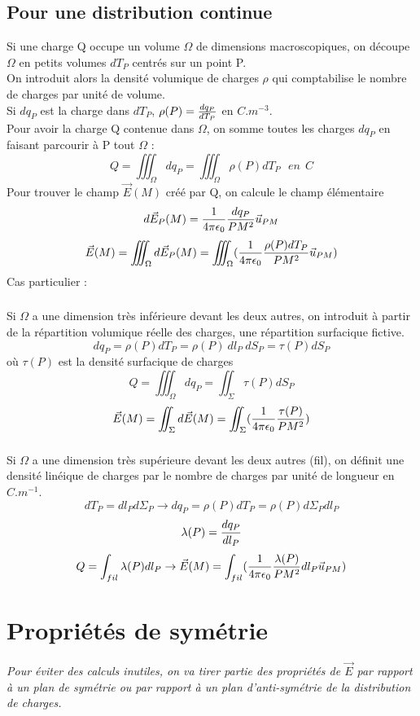 \documentclass[11pt,a4paper,french]{article}
\begin{document}
\subsection{Pour une distribution continue}
Si une charge Q occupe un volume $\Omega$ de dimensions macroscopiques, on découpe $\Omega$ en petits volumes $dT_P$ centrés sur un point P. \\
On introduit alors la densité volumique de charges $\rho$ qui comptabilise le nombre de charges par unité de volume. \\
Si $dq_P$ est la charge dans $dT_P$, $\rho(P) = {dq_P \over dT_P}$ en $C.m^{-3}$. \\
Pour avoir la charge Q contenue dans $\Omega$, on somme toutes les charges $dq_P$ en faisant parcourir à P tout $\Omega$ : 
$$Q = \iiint_\Omega dq_P =\iiint_\Omega \rho(P) dT_P ~~~ en~~ C$$
Pour trouver le champ $\vec E(M)$ créé par Q, on calcule le champ élémentaire
$$d \vec E_P(M) = {1 \over 4 \pi \epsilon_0}{dq_P \over PM^2}\vec u_{PM}$$
$$\vec E(M) = \iiint_\Omega d\vec E_P(M) = \iiint_\Omega ({1 \over 4\pi\epsilon_0}{\rho(P)dT_P \over PM^2}\vec u_{PM})$$
\newpage
Cas particulier : \\
\subsubsection{} Si $\Omega$ a une dimension très inférieure devant les deux autres, on introduit à partir de la répartition volumique réelle des charges, une répartition surfacique fictive.
$$dq_P = \rho(P)dT_P = \rho(P)~dl_P~dS_P = \tau(P)dS_P$$
où $\tau(P)$  est la densité surfacique de charges
$$Q = \iiint_\Omega dq_P = \iint_\Sigma \tau(P)dS_P$$
$$\vec E(M) = \iint_\Sigma d\vec E(M) = \iint_\Sigma ({1 \over 4\pi \epsilon_0} {\tau(P) \over PM^2})$$
\subsubsection{} Si $\Omega$ a une dimension très supérieure devant les deux autres (fil), on définit une densité linéique de charges par le nombre de charges par unité de longueur en $C.m^{-1}$.
$$dT_P = dl_P d\Sigma_P \rightarrow dq_P = \rho(P)dT_P = \rho(P) d\Sigma_P dl_P$$
$$\lambda(P) = {dq_P \over dl_P}$$
$$Q = \int_{fil} \lambda(P)dl_P \rightarrow \vec E(M) = \int_{fil} ({1 \over 4 \pi \epsilon_0}{\lambda(P) \over PM^2} dl_P \vec u_{PM})$$
\newpage
\section{Propriétés de symétrie}
\textit{Pour éviter des calculs inutiles, on va tirer partie des propriétés de $\vec E$ par rapport à un plan de symétrie ou par rapport à un plan d'anti-symétrie de la distribution de charges.}
\end{document}
